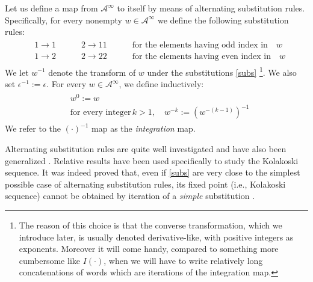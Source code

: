 \documentclass[10pt,a4paper]{article}
\newtheorem{rem}{Remark}
\begin{document}
Let us define a map from $\mathcal{A}^{\infty}$ to itself by means of alternating substitution rules. Specifically, for every nonempty $w\in \mathcal{A}^{\infty}$ we define the following substitution rules:
\begin{align}
\begin{split}
&1\rightarrow 1\qquad\quad
2\rightarrow 11\qquad\quad
\text{for the elements having odd index in}\quad w\\
&1\rightarrow 2\qquad\quad
2\rightarrow 22\qquad\quad
\text{for the elements having even index in}\quad w
\end{split}
\label{subs}
\end{align}
We let $w^{-1}$ denote the transform of $w$ under the substitutions \eqref{subs} \footnote{The reason of this choice is that the converse transformation, which we introduce later, is usually denoted derivative-like, with positive integers as exponents. Moreover it will come handy, compared to something more cumbersome like $I(\cdot)$, when we will have to write relatively long concatenations of words which are iterations of the integration map.}. We also set $\epsilon^{-1}:=\epsilon$. For every $w\in\mathcal{A}^{\infty}$, we define inductively: 
\begin{align}
\begin{split}
&w^{0}:=w\\ 
&\text{for every integer}\, k > 1, \quad w^{-k}:=(w^{-(k-1)})^{-1} 
\end{split}
\label{integral}
\end{align}
We refer to the $(\cdot)^{-1}$ map as the \textit{integration} map.

Alternating substitution rules are quite well investigated and have also been generalized \cite{culik1992iterative}. Relative results have been used specifically to study the Kolakoski sequence. It was indeed proved that, even if \eqref{subs} are very close to the simplest possible case of alternating substitution rules, its fixed point (i.e., Kolakoski sequence) cannot be obtained by iteration of a \textit{simple} substitution \cite{culik1992alternating}.  
%
\end{document}
